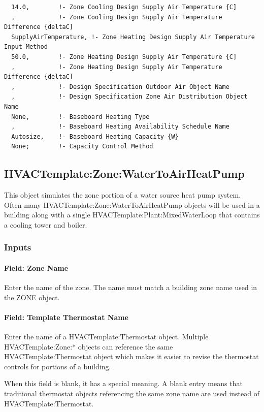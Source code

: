 \begin{lstlisting}
  14.0,        !- Zone Cooling Design Supply Air Temperature {C]
  ,            !- Zone Cooling Design Supply Air Temperature Difference {deltaC]
  SupplyAirTemperature, !- Zone Heating Design Supply Air Temperature Input Method
  50.0,        !- Zone Heating Design Supply Air Temperature {C]
  ,            !- Zone Heating Design Supply Air Temperature Difference {deltaC]
  ,            !- Design Specification Outdoor Air Object Name
  ,            !- Design Specification Zone Air Distribution Object Name
  None,        !- Baseboard Heating Type
  ,            !- Baseboard Heating Availability Schedule Name
  Autosize,    !- Baseboard Heating Capacity {W}
  None;        !- Capacity Control Method
\end{lstlisting}

\subsection{HVACTemplate:Zone:WaterToAirHeatPump}\label{hvactemplatezonewatertoairheatpump}

This object simulates the zone portion of a water source heat pump system. Often many HVACTemplate:Zone:WaterToAirHeatPump objects will be used in a building along with a single HVACTemplate:Plant:MixedWaterLoop that contains a cooling tower and boiler.

\subsubsection{Inputs}\label{inputs-6-011}

\paragraph{Field: Zone Name}\label{field-zone-name-5-001}

Enter the name of the zone. The name must match a building zone name used in the ZONE object.

\paragraph{Field: Template Thermostat Name}\label{field-template-thermostat-name-5}

Enter the name of a HVACTemplate:Thermostat object. Multiple HVACTemplate:Zone:* objects can reference the same HVACTemplate:Thermostat object which makes it easier to revise the thermostat controls for portions of a building.

When this field is blank, it has a special meaning. A blank entry means that traditional thermostat objects referencing the same zone name are used instead of HVACTemplate:Thermostat.

